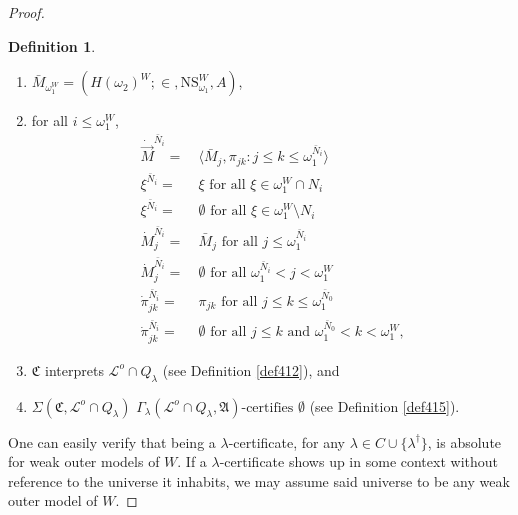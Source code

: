 \documentclass[12pt, twoside]{memoir}
\numberwithin{equation}{section}
\theoremstyle{definition}
\newtheorem{defi}[thm]{Definition}
\theoremstyle{remark}
\theoremstyle{definition}
\theoremstyle{definition}
\theoremstyle{definition}
\theoremstyle{remark}
\begin{document}
\begin{proof}
\begin{defi}
\begin{enumerate}[label=(C\arabic*)$_{\lambda}$, leftmargin=40pt]
    \item\label{cd7} $\bar{M}_{\omega_1^W} = (H(\omega_2)^W; \in, \mathrm{NS}_{\omega_1}^W, A)$,
    \item\label{2ndlast} for all $i \leq \omega_1^W$, 
    \begin{align*}
         \dot{\Vec{M}}^{\bar{N}_i} = \ & \langle \bar{M}_j, \pi_{jk} : j \leq k \leq \omega_1^{\bar{N}_i} \rangle \\
         \xi^{\bar{N}_i} = \ & \xi \text{ for all } \xi \in \omega_1^W \cap N_i \\
         \xi^{\bar{N}_i} = \ & \emptyset \text{ for all } \xi \in \omega_1^W \setminus N_i \\
         \dot{M}_j^{\bar{N}_i} = \ & \bar{M}_j \text{ for all } j \leq \omega_1^{\bar{N}_i} \\
         \dot{M}_j^{\bar{N}_i} = \ & \emptyset \text{ for all } \omega_1^{\bar{N}_i} < j < \omega_1^W \\
         \dot{\pi}_{jk}^{\bar{N}_i} = \ & \pi_{jk} \text{ for all } j \leq k \leq \omega_1^{\bar{N}_0} \\
         \dot{\pi}_{jk}^{\bar{N}_i} = \ & \emptyset \text{ for all } j \leq k \text{ and } \omega_1^{\bar{N}_0} < k < \omega_1^W \text{,}
    \end{align*}
    \item\label{cdlast} $\mathfrak{C}$ interprets $\mathcal{L}^o \cap Q_{\lambda}$ (see Definition \ref{def412}), and
    \item\label{cdrlast} $\Sigma(\mathfrak{C}, \mathcal{L}^o \cap Q_{\lambda})$ $\Gamma_{\lambda} (\mathcal{L}^o \cap Q_{\lambda}, \mathfrak{A}) \text{-certifies } \emptyset$ (see Definition \ref{def415}).
\end{enumerate}
\end{defi}

One can easily verify that being a $\lambda$-certificate, for any $\lambda \in C \cup \{\lambda^{\dagger}\}$, is absolute for weak outer models of $W$. If a $\lambda$-certificate shows up in some context without reference to the universe it inhabits, we may assume said universe to be any weak outer model of $W$.


\end{proof}
\end{document}
